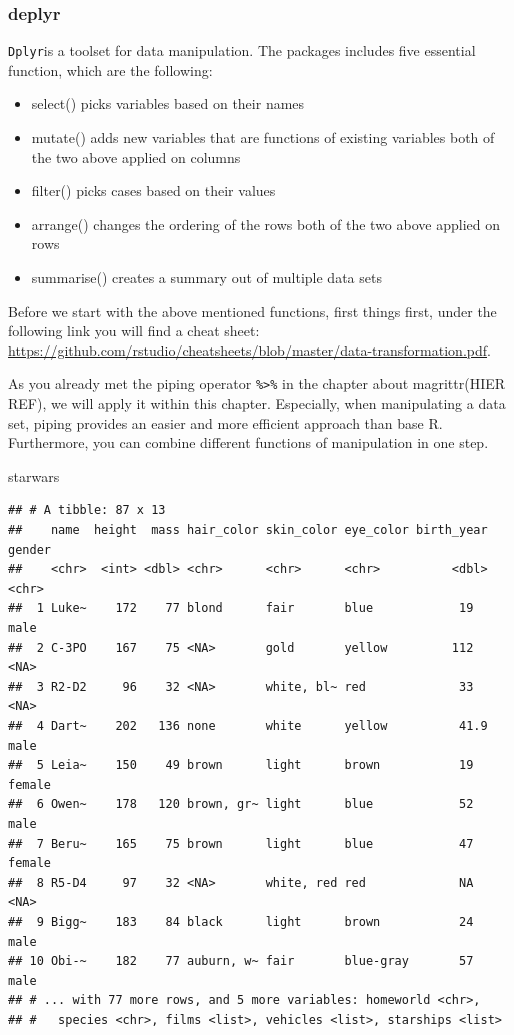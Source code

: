 \documentclass[]{report}
\newenvironment{Shaded}{\begin{snugshade}}{\end{snugshade}}
\newcommand{\NormalTok}[1]{#1}
\begin{document}
\subsubsection{deplyr}\label{deplyr}

\texttt{Dplyr}is a toolset for data manipulation. The packages includes
five essential function, which are the following:

\begin{itemize}
\item
  select() picks variables based on their names
\item
  mutate() adds new variables that are functions of existing variables
  both of the two above applied on columns
\item
  filter() picks cases based on their values
\item
  arrange() changes the ordering of the rows both of the two above
  applied on rows
\item
  summarise() creates a summary out of multiple data sets
\end{itemize}

Before we start with the above mentioned functions, first things first,
under the following link you will find a cheat sheet:
\url{https://github.com/rstudio/cheatsheets/blob/master/data-transformation.pdf}.

As you already met the piping operator \texttt{\%\textgreater{}\%} in
the chapter about magrittr(HIER REF), we will apply it within this
chapter. Especially, when manipulating a data set, piping provides an
easier and more efficient approach than base R. Furthermore, you can
combine different functions of manipulation in one step.

\begin{Shaded}
\begin{Highlighting}[]
\NormalTok{starwars}
\end{Highlighting}
\end{Shaded}

\begin{verbatim}
## # A tibble: 87 x 13
##    name  height  mass hair_color skin_color eye_color birth_year gender
##    <chr>  <int> <dbl> <chr>      <chr>      <chr>          <dbl> <chr> 
##  1 Luke~    172    77 blond      fair       blue            19   male  
##  2 C-3PO    167    75 <NA>       gold       yellow         112   <NA>  
##  3 R2-D2     96    32 <NA>       white, bl~ red             33   <NA>  
##  4 Dart~    202   136 none       white      yellow          41.9 male  
##  5 Leia~    150    49 brown      light      brown           19   female
##  6 Owen~    178   120 brown, gr~ light      blue            52   male  
##  7 Beru~    165    75 brown      light      blue            47   female
##  8 R5-D4     97    32 <NA>       white, red red             NA   <NA>  
##  9 Bigg~    183    84 black      light      brown           24   male  
## 10 Obi-~    182    77 auburn, w~ fair       blue-gray       57   male  
## # ... with 77 more rows, and 5 more variables: homeworld <chr>,
## #   species <chr>, films <list>, vehicles <list>, starships <list>
\end{verbatim}
\end{document}

